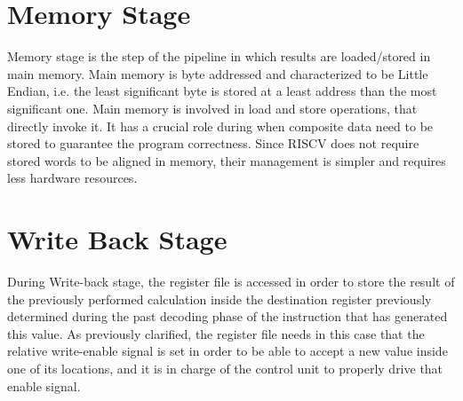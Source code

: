 \section{Memory Stage}
Memory stage is the step of the pipeline in which results are loaded/stored in main memory.
Main memory is byte addressed and characterized to be Little Endian, i.e. the least significant byte is stored at a least address than the most significant one.
Main memory is involved in load and store operations, that directly invoke it. It has a crucial role during when composite data need to be stored to guarantee the program correctness.
Since RISCV does not require stored words to be aligned in memory, their management is simpler and requires less hardware resources.
\section{Write Back Stage}
During Write-back stage, the register file is accessed in order to store the result of the previously performed calculation inside the destination register previously determined during the past decoding phase of the instruction that has generated this value.
As previously clarified, the register file needs in this case that the relative write-enable signal is set in order to be able to accept a new value inside one of its locations, and it is in charge of the control unit to properly drive that enable signal.